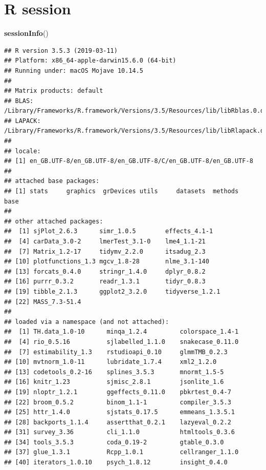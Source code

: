 \documentclass[]{article}
\newenvironment{Shaded}{\begin{snugshade}}{\end{snugshade}}
\newcommand{\KeywordTok}[1]{\textcolor[rgb]{0.13,0.29,0.53}{\textbf{#1}}}
\newcommand{\NormalTok}[1]{#1}
\begin{document}
\hypertarget{r-session}{%
\section{R session}\label{r-session}}

\begin{Shaded}
\begin{Highlighting}[]
\KeywordTok{sessionInfo}\NormalTok{()}
\end{Highlighting}
\end{Shaded}

\begin{verbatim}
## R version 3.5.3 (2019-03-11)
## Platform: x86_64-apple-darwin15.6.0 (64-bit)
## Running under: macOS Mojave 10.14.5
## 
## Matrix products: default
## BLAS: /Library/Frameworks/R.framework/Versions/3.5/Resources/lib/libRblas.0.dylib
## LAPACK: /Library/Frameworks/R.framework/Versions/3.5/Resources/lib/libRlapack.dylib
## 
## locale:
## [1] en_GB.UTF-8/en_GB.UTF-8/en_GB.UTF-8/C/en_GB.UTF-8/en_GB.UTF-8
## 
## attached base packages:
## [1] stats     graphics  grDevices utils     datasets  methods   base     
## 
## other attached packages:
##  [1] sjPlot_2.6.3      simr_1.0.5        effects_4.1-1    
##  [4] carData_3.0-2     lmerTest_3.1-0    lme4_1.1-21      
##  [7] Matrix_1.2-17     tidymv_2.2.0      itsadug_2.3      
## [10] plotfunctions_1.3 mgcv_1.8-28       nlme_3.1-140     
## [13] forcats_0.4.0     stringr_1.4.0     dplyr_0.8.2      
## [16] purrr_0.3.2       readr_1.3.1       tidyr_0.8.3      
## [19] tibble_2.1.3      ggplot2_3.2.0     tidyverse_1.2.1  
## [22] MASS_7.3-51.4    
## 
## loaded via a namespace (and not attached):
##  [1] TH.data_1.0-10      minqa_1.2.4         colorspace_1.4-1   
##  [4] rio_0.5.16          sjlabelled_1.1.0    snakecase_0.11.0   
##  [7] estimability_1.3    rstudioapi_0.10     glmmTMB_0.2.3      
## [10] mvtnorm_1.0-11      lubridate_1.7.4     xml2_1.2.0         
## [13] codetools_0.2-16    splines_3.5.3       mnormt_1.5-5       
## [16] knitr_1.23          sjmisc_2.8.1        jsonlite_1.6       
## [19] nloptr_1.2.1        ggeffects_0.11.0    pbkrtest_0.4-7     
## [22] broom_0.5.2         binom_1.1-1         compiler_3.5.3     
## [25] httr_1.4.0          sjstats_0.17.5      emmeans_1.3.5.1    
## [28] backports_1.1.4     assertthat_0.2.1    lazyeval_0.2.2     
## [31] survey_3.36         cli_1.1.0           htmltools_0.3.6    
## [34] tools_3.5.3         coda_0.19-2         gtable_0.3.0       
## [37] glue_1.3.1          Rcpp_1.0.1          cellranger_1.1.0   
## [40] iterators_1.0.10    psych_1.8.12        insight_0.4.0      

\end{verbatim}
\end{document}
